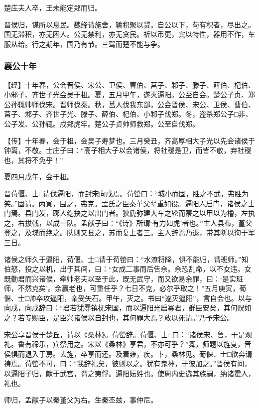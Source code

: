 \documentclass[]{article}
\begin{document}
楚庄夫人卒，王未能定郑而归。

晋侯归，谋所以息民。魏绛请施舍，输积聚以贷。自公以下，苟有积者，尽出之。国无滞积，亦无困人。公无禁利，亦无贪民。祈以币更，宾以特性，器用不作，车服从给。行之期年，国乃有节。三驾而楚不能与争。

\hypertarget{header-n1931}{%
\subsubsection{襄公十年}\label{header-n1931}}

【经】十年春，公会晋侯、宋公、卫侯、曹伯、莒子、邾子、滕子、薛伯、杞伯、小邾子、齐世子光会吴于柤。夏，五月甲午，遂灭逼阳。公至自会。楚公子贞、郑公孙辄帅师伐宋。晋师伐秦。秋，莒人伐我东鄙。公会晋侯、宋公、卫侯、曹伯、莒子、邾子、齐世子光、滕子、薛伯、杞伯、小邾子伐郑。冬，盗杀郑公子□非、公子发、公孙辄。戍郑虎牢。楚公子贞帅师救郑。公至自伐郑。

【传】十年春，会于柤，会吴子寿梦也。三月癸丑，齐高厚相大子光以先会诸侯于钟离，不敬。士庄子曰：``高子相大子以会诸侯，将社稷是卫，而皆不敬，弃社稷也，其将不免乎！''

夏四月戊午，会于柤。

晋荀偃、士□请伐逼阳，而封宋向戌焉。荀罃曰：``城小而固，胜之不武，弗胜为笑。''固请。丙寅，围之，弗克。孟氏之臣秦堇父辇重如役。逼阳人启门，诸侯之士门焉。县门发，郰人纥抉之以出门者。狄虒弥建大车之轮而蒙之以甲以为橹，左执之，右拔戟，以成一队。孟献子曰：``《诗》所谓`有力如虎'者也。''主人县布，堇父登之，及堞而绝之。队则又县之，苏而复上者三。主人辞焉乃退，带其断以徇于军三日。

诸侯之师久于逼阳，荀偃、士□请于荀罃曰：``水潦将降，惧不能归，请班师。''知伯怒，投之以机，出于其间，曰：``女成二事而后告余。余恐乱命，以不女违。女既勤君而兴诸侯，牵帅老夫以至于此，既无武守，而又欲易余罪，曰：`是实班师，不然克矣'。余赢老也，可重任乎？七日不克，必尔乎取之！''五月庚寅，荀偃、士□帅卒攻逼阳，亲受矢石。甲午，灭之。书曰``遂灭逼阳''，言自会也。以与向戌，向戌辞曰：``君若犹辱镇抚宋国，而以逼阳光启寡君，群臣安矣，其何贶如之？若专赐臣，是臣兴诸侯以自封也，其何罪大焉？敢以死请。''乃予宋公。

宋公享晋侯于楚丘，请以《桑林》。荀罃辞。荀偃、士□曰：``诸侯宋、鲁，于是观礼。鲁有禘乐，宾祭用之。宋以《桑林》享君，不亦可乎？''舞，师题以旌夏，晋侯惧而退入于房。去旌，卒享而还。及着雍，疾。卜，桑林见。荀偃、士□欲奔请祷焉。荀罃不可，曰：``我辞礼矣，彼则以之。犹有鬼神，于彼加之。''晋侯有间，以逼阳子归，献于武宫，谓之夷俘。逼阳妘姓也。使周内史选其族嗣，纳诸霍人，礼也。

师归，孟献子以秦堇父为右。生秦丕兹，事仲尼。
\end{document}
